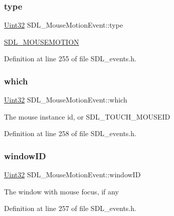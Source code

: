 \subsubsection{\texorpdfstring{type}{type}}
{\footnotesize\ttfamily \mbox{\hyperlink{_s_d_l__stdinc_8h_add440eff171ea5f55cb00c4a9ab8672d}{Uint32}} S\+D\+L\+\_\+\+Mouse\+Motion\+Event\+::type}

\mbox{\hyperlink{_s_d_l__events_8h_a3b589e89be6b35c02e0dd34a55f3fccaa04c436ef80fef38fb77a89e0e9124c30}{S\+D\+L\+\_\+\+M\+O\+U\+S\+E\+M\+O\+T\+I\+ON}} 

Definition at line 255 of file S\+D\+L\+\_\+events.\+h.

\mbox{\label{struct_s_d_l___mouse_motion_event_a6f04c17b4305683915e2fd2dc3c36dbc}} 
\subsubsection{\texorpdfstring{which}{which}}
{\footnotesize\ttfamily \mbox{\hyperlink{_s_d_l__stdinc_8h_add440eff171ea5f55cb00c4a9ab8672d}{Uint32}} S\+D\+L\+\_\+\+Mouse\+Motion\+Event\+::which}

The mouse instance id, or S\+D\+L\+\_\+\+T\+O\+U\+C\+H\+\_\+\+M\+O\+U\+S\+E\+ID 

Definition at line 258 of file S\+D\+L\+\_\+events.\+h.

\mbox{\label{struct_s_d_l___mouse_motion_event_aa9976725242ada93a9e18e7fdf5796e6}} 
\subsubsection{\texorpdfstring{windowID}{windowID}}
{\footnotesize\ttfamily \mbox{\hyperlink{_s_d_l__stdinc_8h_add440eff171ea5f55cb00c4a9ab8672d}{Uint32}} S\+D\+L\+\_\+\+Mouse\+Motion\+Event\+::window\+ID}

The window with mouse focus, if any 

Definition at line 257 of file S\+D\+L\+\_\+events.\+h.

\mbox{\label{struct_s_d_l___mouse_motion_event_a36398bb4a5308446a262b0bfc8baa80a}} 
